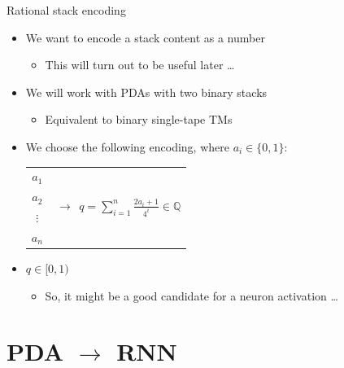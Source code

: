 \documentclass{beamer}
\newcommand{\Q}{\mathbb{Q}}
\begin{document}
\begin{frame}{Rational stack encoding}
	\begin{itemize}
		\item We want to encode a stack content as a number 
		\pause
		\begin{itemize}
			\item This will turn out to be useful later \dots
			\pause
		\end{itemize}
		\item We will work with PDAs with two \textcolor{unifiRed}{binary} stacks
		\pause
		\begin{itemize}
			\item Equivalent to \textcolor{unifiRed}{binary} single-tape TMs
			\pause
		\end{itemize}
		\item We choose the following encoding, where $a_i\in\{0,1\}$:
		\begin{table}
			\centering
			\begin{tabular}{|c| c}
				\cline{1-1}
				$a_1$   &\multirow{4}{*}{$\,\longrightarrow\;\,\displaystyle{q=\sum_{i=1}^{n}\frac{2a_i+1}{4^i}\in\Q}$}\\
				\cline{1-1}
				$a_2$   &\\
				\cline{1-1}
				$\vdots$&\\
				\cline{1-1}
				$a_n$   &\\
				\cline{1-1}
			\end{tabular}
		\end{table}
		\pause
		\item $q\in[0,1)$
		\pause
		\begin{itemize}
			\item So, it might be a good candidate for a neuron activation \dots
		\end{itemize}
	\end{itemize}
\end{frame}

\section{PDA $\to$ RNN}
\end{document}
